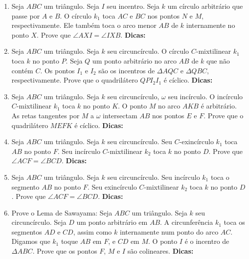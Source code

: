 \documentclass{article}
\newcommand{\dica}{\textbf{Dicas:}}
\newcommand{\iniTri}{Seja $ABC$ um triângulo}
\begin{document}
\begin{multicols}{2}
\begin{enumerate}
    \item \iniTri. Seja $I$ seu incentro. Seja $k$ um círculo arbitrário que passe por $A$ e $B$. O círculo $k_1$ toca $AC$ e $BC$ nos pontos $N$ e $M$, respectivamente. Ele também toca o arco menor $AB$ de $k$ internamente no ponto $X$. Prove que $\angle AXI=\angle IXB$. \dica %
    
    \item \iniTri. Seja $k$ seu circuncírculo. O círculo $C$-mixtilinear $k_1$ toca $k$ no ponto $P$. Seja $Q$ um ponto arbitrário no arco $AB$ de $k$ que não contém $C$. Os pontos $I_1$ e $I_2$ são os incentros de $\Delta AQC$ e $\Delta QBC$, respectivamente. Prove que o quadrilátero $QPI_2I_1$ é cíclico. \dica %
    
    \item \iniTri. Seja $k$ seu circuncírculo, $\omega$ seu incírculo. O incírculo $C$-mixtilinear $k_1$ toca $k$ no ponto $K$. O ponto $M$ no arco $AKB$ é arbitrário. As retas tangentes por $M$ a $\omega$ intersectam $AB$ nos pontos $E$ e $F$. Prove que o quadrilátero $MEFK$ é cíclico. \dica %
    
    \item \iniTri. Seja $k$ seu circuncírculo. Seu $C$-exincírculo $k_1$ toca $AB$ no ponto $F$. Seu incírculo $C$-mixtilinear $k_2$ toca $k$ no ponto $D$. Prove que $\angle ACF=\angle BCD$. \dica %
    
    \item \iniTri. Seja $k$ seu circuncírculo. Seu incírculo $k_1$ toca o segmento $AB$ no ponto $F$. Seu exincírculo $C$-mixtilinear $k_2$ toca $k$ no ponto $D$. Prove que $\angle ACF=\angle BCD$. \dica %
    
    \item Prove o Lema de Sawayama: \iniTri. Seja $k$ seu circuncírculo. Seja $D$ um ponto arbitrário em $AB$. A circunferência $k_1$ toca os segmentos $AD$ e $CD$, assim como $k$ internamente num ponto do arco $AC$. Digamos que $k_1$ toque $AB$ em $F$, e $CD$ em $M$. O ponto $I$ é o incentro de $\Delta ABC$. Prove que os pontos $F$, $M$ e $I$ são colineares. \dica %
    

\end{enumerate}
\end{multicols}
\end{document}
